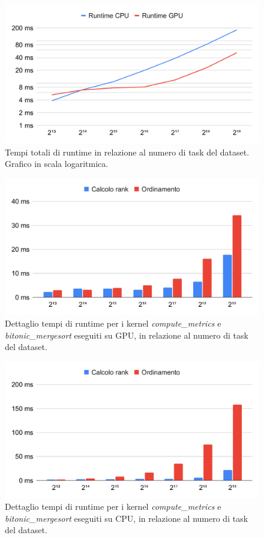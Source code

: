 \begin{center}
\begin{figure}
\includegraphics[width=\textwidth]{Images/runtime_total.pdf}
\caption{Tempi totali di runtime in relazione al numero di task del dataset. Grafico in scala logaritmica.}
\label{runtimetotal}
\end{figure}
\begin{figure}
\includegraphics[width=\textwidth]{Images/kernel_cpu.pdf}
\caption{Dettaglio tempi di runtime per i kernel \textit{compute\_metrics} e \textit{bitonic\_mergesort} eseguiti su GPU, in relazione al numero di task del dataset.}
\label{runtimegpu}
\end{figure}
\begin{figure}
\includegraphics[width=\textwidth]{Images/kernel_gpu.pdf}
\caption{Dettaglio tempi di runtime per i kernel \textit{compute\_metrics} e \textit{bitonic\_mergesort} eseguiti su CPU, in relazione al numero di task del dataset.}
\label{runtimecpu}
\end{figure}
\end{center}
